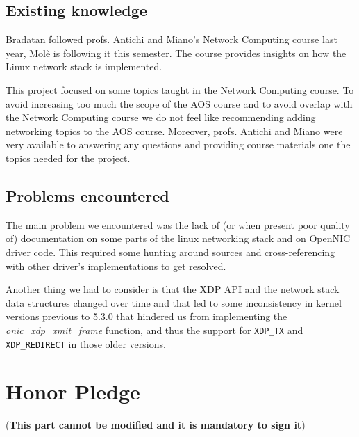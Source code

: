 \documentclass[10pt,a4]{article}
\begin{document}
\subsection{Existing knowledge}

Bradatan followed profs. Antichi and Miano's Network Computing course last year,
Molè is following it this semester. The course provides insights on how the Linux
network stack is implemented.

This project focused on some topics taught in the Network Computing course. To
avoid increasing too much the scope of the AOS course and to avoid overlap with
the Network Computing course we do not feel like recommending adding networking
topics to the AOS course. Moreover, profs. Antichi and Miano were very available
to answering any questions and providing course materials one the topics needed
for the project.

\subsection{Problems encountered}
%

The main problem we encountered was the lack of (or when present
poor quality of) documentation on some parts of the linux networking stack and
on OpenNIC driver code. This required some hunting around sources and
cross-referencing with other driver's implementations to get resolved.

Another thing we had to consider is that the XDP API and the network stack data structures changed
over time and that led to some inconsistency in kernel versions previous to 5.3.0 that hindered us from
implementing the \textit{onic\_xdp\_xmit\_frame} function, and thus the support
for \texttt{XDP\_TX} and \texttt{XDP\_REDIRECT} in those older versions.

\section{Honor Pledge}
(\textbf{This part cannot be modified and it is mandatory to sign it})
\end{document}
